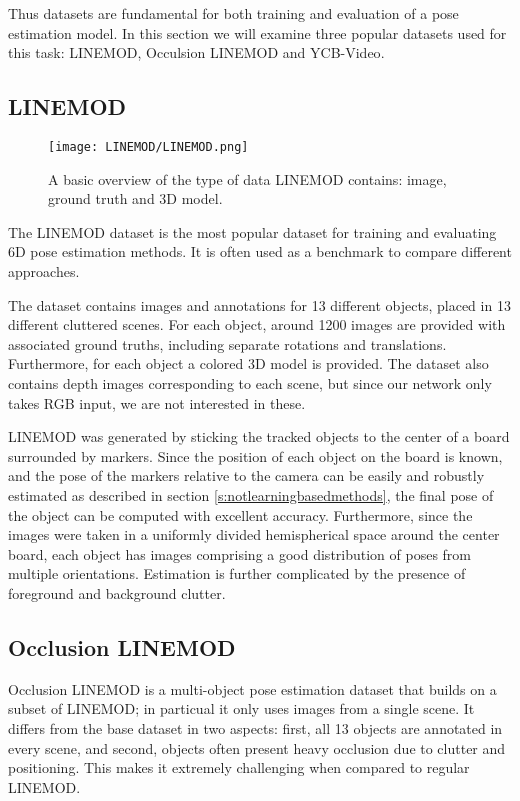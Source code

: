 Thus datasets are fundamental for both training and evaluation of a pose estimation model. In this section we will examine three popular datasets used for this task: LINEMOD\cite{linemod}, Occulsion LINEMOD\cite{occlusionlinemod} and YCB-Video\cite{PoseCNN}.

\subsection{LINEMOD}
\label{ss:LINEMOD}

\begin{figure}[ht]
    \centering
    \texttt{[image: LINEMOD/LINEMOD.png]}
    \caption{A basic overview of the type of data LINEMOD contains: image, ground truth and 3D model.}
    \label{fig:linemod}
\end{figure}

The LINEMOD\cite{linemod} dataset is the most popular dataset for training and evaluating 6D pose estimation methods. It is often used as a benchmark to compare different approaches.

The dataset contains images and annotations for 13 different objects, placed in 13 different cluttered scenes. For each object, around 1200 images are provided with associated ground truths, including separate rotations and translations. Furthermore, for each object a colored 3D model is provided. The dataset also contains depth images corresponding to each scene, but since our network only takes RGB input, we are not interested in these.

LINEMOD was generated by sticking the tracked objects to the center of a board surrounded by markers. Since the position of each object on the board is known, and the pose of the markers relative to the camera can be easily and robustly estimated as described in section \ref{s:notlearningbasedmethods}, the final pose of the object can be computed with excellent accuracy. Furthermore, since the images were taken in a uniformly divided hemispherical space around the center board, each object has images comprising a good distribution of poses from multiple orientations. Estimation is further complicated by the presence of foreground and background clutter.

\subsection{Occlusion LINEMOD}

Occlusion LINEMOD\cite{occlusionlinemod} is a multi-object pose estimation dataset that builds on a subset of LINEMOD; in particual it only uses images from a single scene. It differs from the base dataset in two aspects: first, all 13 objects are annotated in every scene, and second, objects often present heavy occlusion due to clutter and positioning. This makes it extremely challenging when compared to regular LINEMOD.

